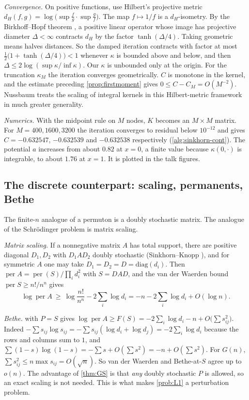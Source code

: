 \emph{Convergence.} On positive functions, use Hilbert's projective metric
$d_H(f,g)=\log\bigl(\sup\frac fg\cdot\sup\frac gf\bigr)$. The map $f\mapsto1/f$ is a
$d_H$-isometry. By the Birkhoff--Hopf theorem \cite{Birkhoff}, a positive linear operator
whose image has projective diameter $\Delta<\infty$ contracts $d_H$ by the factor
$\tanh(\Delta/4)$. Taking geometric means halves distances. So the damped iteration
contracts with factor at most $\frac12\bigl(1+\tanh(\Delta/4)\bigr)<1$ whenever
$\kappa$ is bounded above and below, and then $\Delta\le2\log(\sup\kappa/\inf\kappa)$.
Our $\kappa$ is unbounded only at the origin. For the truncation $\kappa_M$ the iteration
converges geometrically. $C$ is monotone in the kernel, and the estimate preceding
\cref{prop:firstmoment} gives $0\le C-C_M=O(M^{-2})$. Nussbaum \cite{Nussbaum} treats
the scaling of integral kernels in this Hilbert-metric framework in much greater generality.

\emph{Numerics.} With the midpoint rule on $M$ nodes, $K$ becomes an $M\times M$ matrix.
For $M=400,1600,3200$ the iteration converges to residual below $10^{-12}$ and gives
$C=-0.632547$, $-0.632539$ and $-0.632538$ respectively (\cref{alg:sinkhorn-cont}). The potential
$a$ increases from about $0.82$ at $x=0$, a finite value because $\kappa(0,\cdot)$ is
integrable, to about $1.76$ at $x=1$. It is plotted in the talk figures.

\subsection{The discrete counterpart: scaling, permanents, Bethe}\label{app:bethe}
The finite-$n$ analogue of a permuton is a doubly stochastic matrix. The analogue of the
Schr\"odinger problem is matrix scaling.

\emph{Matrix scaling.} If a nonnegative matrix $A$ has total support, there are positive
diagonal $D_1,D_2$ with $D_1AD_2$ doubly stochastic (Sinkhorn--Knopp
\cite{SinkhornKnopp}), and for symmetric $A$ one may take $D_1=D_2=D=\mathrm{diag}(d_i)$.
Then $\operatorname{per}A=\operatorname{per}(S)/\prod_id_i^2$ with $S=DAD$, and the van der
Waerden bound $\operatorname{per}S\ge n!/n^n$ \cite{Egorychev,Falikman} gives
\[
\log\operatorname{per}A\ \ge\ \log\frac{n!}{n^n}-2\sum_i\log d_i=-n-2\sum_i\log d_i+O(\log n).
\]

\emph{Bethe.}  with $P=S$ gives
$\log\operatorname{per}A\ge F(S)=-2\sum_i\log d_i-n+O\bigl(\sum s_{ij}^2\bigr)$. Indeed
$-\sum s_{ij}\log s_{ij}=-\sum s_{ij}(\log d_i+\log d_j)=-2\sum_i\log d_i$ because the rows and
columns sum to $1$, and $\sum(1-s)\log(1-s)=-\sum s+O(\sum s^2)=-n+O(\sum s^2)$. For
$G(n)$, $\sum s_{ij}^2\le n\max s_{ij}=O(\sqrt n)$. So van der Waerden and Bethe-at-$S$
agree up to $o(n)$. The advantage of \cref{thm:GS} is that \emph{any} doubly stochastic $P$
is allowed, so an exact scaling is not needed. This is what makes \cref{prob:L1} a
perturbation problem.

